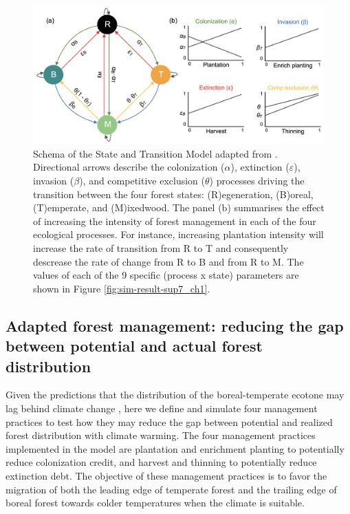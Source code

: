 \hypertarget{fig:model}{%
\begin{figure}
\centering
\includegraphics[width=1\textwidth,height=\textheight]{manuscript/img/model_equation_fm.png}
\caption[{Schema of the State and Transition Model adapted from
\citet{Vissault2020}}]{Schema of the State and Transition Model adapted
from \citet{Vissault2020}. Directional arrows describe the colonization
(\(\alpha\)), extinction (\(\varepsilon\)), invasion (\(\beta\)), and
competitive exclusion (\(\theta\)) processes driving the transition
between the four forest states: (R)egeneration, (B)oreal, (T)emperate,
and (M)ixedwood. The panel (b) summarises the effect of increasing the
intensity of forest management in each of the four ecological processes.
For instance, increasing plantation intensity will increase the rate of
transition from R to T and consequently descrease the rate of change
from R to B and from R to M. The values of each of the 9 specific
(process x state) parameters are shown in Figure \ref{fig:sim-result-sup7_ch1}.}
\label{fig:model}
\end{figure}
}

\hypertarget{adapted-forest-management-reducing-the-gap-between-potential-and-actual-forest-distribution}{%
\subsection{Adapted forest management: reducing the gap between
potential and actual forest
distribution}\label{adapted-forest-management-reducing-the-gap-between-potential-and-actual-forest-distribution}}

Given the predictions that the distribution of the boreal-temperate
ecotone may lag behind climate change \citep{Talluto2017, Vissault2020},
here we define and simulate four management practices to test how they
may reduce the gap between potential and realized forest distribution
with climate warming. The four management practices implemented in the
model are plantation and enrichment planting to potentially reduce
colonization credit, and harvest and thinning to potentially reduce
extinction debt. The objective of these management practices is to favor
the migration of both the leading edge of temperate forest and the
trailing edge of boreal forest towards colder temperatures when the
climate is suitable.\\

